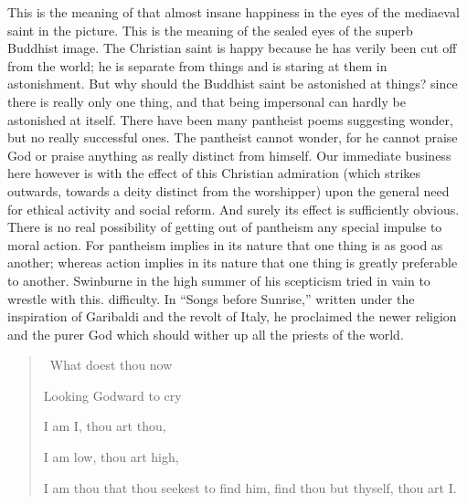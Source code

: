 \documentclass{book}
\begin{document}
This is the meaning of that almost insane happiness in the eyes of the mediaeval saint in the picture. This is the meaning of the sealed eyes of the superb Buddhist image. The Christian saint is happy because he has verily been cut off from the world; he is separate from things and is staring at them in astonishment. But why should the Buddhist saint be astonished at things? since there is really only one thing, and that being impersonal can hardly be astonished at itself. There have been many pantheist poems suggesting wonder, but no really successful ones. The pantheist cannot wonder, for he cannot praise God or praise anything as really distinct from himself. Our immediate business here however is with the effect of this Christian admiration (which strikes outwards, towards a deity distinct from the worshipper) upon the general need for ethical activity and social reform. And surely its effect is sufficiently obvious. There is no real possibility of getting out of pantheism any special impulse to moral action. For pantheism implies in its nature that one thing is as good as another; whereas action implies in its nature that one thing is greatly preferable to another. Swinburne in the high summer of his scepticism tried in vain to wrestle with this. difficulty. In “Songs before Sunrise,” written under the inspiration of Garibaldi and the revolt of Italy, he proclaimed the newer religion and the purer God which should wither up all the priests of the world.

\begin{quotation}\
	What doest thou now

	Looking Godward to cry

	I am I, thou art thou,

	I am low, thou art high,

	I am thou that thou seekest to find him, find thou but thyself, thou art I.
\end{quotation}
\end{document}
